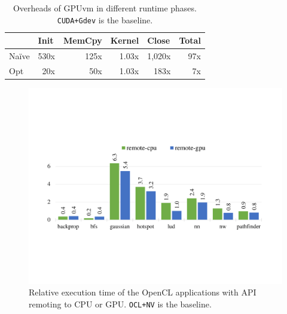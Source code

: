\begin{table}[!ht]
	\centering
	\begin{tabular}{l|r|r|r|r|r|}
		\cline{2-6}
		& \multicolumn{1}{l|}{Init} & \multicolumn{1}{l|}{MemCpy} & \multicolumn{1}{l|}{Kernel} & \multicolumn{1}{l|}{Close} & \multicolumn{1}{l|}{Total} \\ \hline
		\multicolumn{1}{|l|}{Na\"ive} & 530x & 125x & 1.03x & 1,020x & 97x \\ \hline
		\multicolumn{1}{|l|}{Opt} & 20x & 50x & 1.03x & 183x & 7x \\ \hline
	\end{tabular}
	\caption{{\footnotesize Overheads of GPUvm in different runtime phases. \texttt{CUDA+Gdev} is the baseline.}}
	\label{tb_gpuvm_overhead}
\end{table}


\begin{figure}[!ht]
	\centering
	\includegraphics[width=\linewidth,trim={2cm 5.5cm 2.2cm 6cm},clip]{data/api_remote/api_remote_overhead.pdf}
	\caption{{\footnotesize Relative execution time of the OpenCL applications with API remoting to CPU or GPU. \texttt{OCL+NV} is the baseline.}}
	\label{fig_api_remote_overhead} \end{figure}

